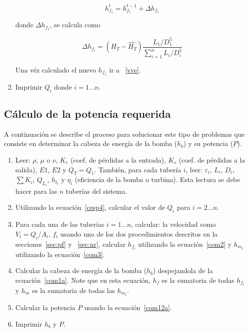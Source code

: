 \documentclass[11pt, oneside]{article}
\begin{document}
\begin{enumerate}
\begin{equation} 
h_{f_1}^t  = h_{f_1}^{t-1}  + \Delta h_{f_1}
\label{cpd2}
\end{equation}

donde $\Delta h_{f_1}$, se calcula como

\begin{equation} 
\Delta h_{f_i} = (H_T - \hat{H_T}) \frac{L_1 / D_1^5}{\sum_{i=1}^{n} L_i / D_i^5 }
\label{cpd3}
\end{equation}

Una v\'ez calculado el nuevo $h_{f_1}$ ir a ~\ref{vve}.

\item \label{prf} Imprimir $Q_i$ donde $i = 1 ... n$. 

\end{enumerate}
\subsection{C\'alculo de la potencia requerida}
A continuaci\'on se describe el proceso para solucionar este tipo de problemas que consiste en determinar la cabeza de energ\'ia de la bomba ($h_b$) y su potencia  ($P$).

\begin{enumerate}
\item Leer: $\rho$, $\mu$ o $\nu$, $K_e$ (coef. de p\'erdidas a la entrada), $K_s$ (coef. de p\'erdidas a la salida), $E1$, $E2$ y $Q_T = Q_1$. Tambi\'en, para cada tuber\'ia $i$, leer: $\varepsilon_i$, $L_i$, $D_i$, $\sum K_i$, $Q_{L_i}$, $h_{t_i}$ y $\eta_i$ (eficiencia de la bomba o turbina). Esta lectura se debe hacer para las $n$ tuber\'ias del sistema.
\item Utilizando la ecuaci\'on~\ref{cesp4}, calcular el valor de $Q_i$ para $i=2...n$.
\item Para cada una de las tuber\'ias $i=1...n$, calcular: la velocidad como $V_i = Q_i /A_i $, $f_i$ usando uno de los dos procedimientos descritos en la secciones~\ref{sec:pf} y ~\ref{sec:nr}, calcular $h_{f_i}$ utilizando la ecuaci\'on~\ref{com2} y $h_{m_i}$  utilizando la ecuaci\'on~\ref{com3}.
\item Calcular la cabeza de energ\'ia de la bomba ($h_b$) despejandola de la ecuaci\'on~\ref{com1a}. Note que  en esta ecuaci\'on, $h_f$ es la sumatoria de todas $h_{f_i}$ y $h_m$ es la sumatoria de todas las $h_{m_i}$. 
\item Calcular la potencia $P$ usando la ecuaci\'on~\ref{com12a}.
\item Imprimir $h_b$ y $P$.
\end{enumerate}
\end{document}
